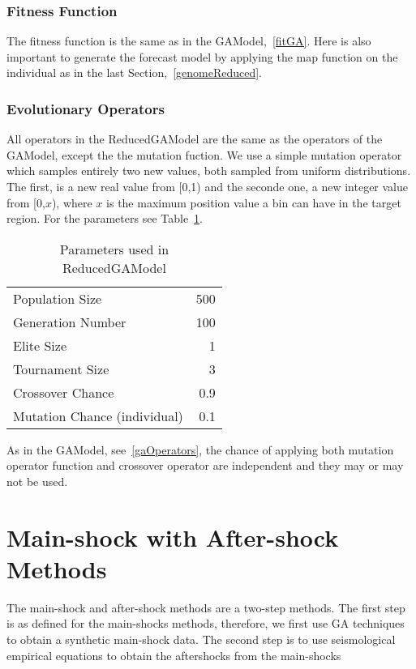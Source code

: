 \subsubsection{Fitness Function}
The fitness function is the same as in the GAModel,~\ref{fitGA}. Here is also important to generate the forecast model by applying the map function on the individual as in the last Section,~\ref{genomeReduced}.\\

\subsubsection{Evolutionary Operators}\label{ReducedOperators}
All operators in the ReducedGAModel are the same as the operators of the GAModel, except the the mutation fuction. We use a simple mutation operator which samples entirely two new values, both sampled from uniform distributions. The first, is a new real value from [0,1) and the seconde one, a new integer value from [0,$x$), where $x$ is the maximum position value a bin can have in the target region. For the parameters see Table~\ref{GAHParameters}.

\begin{table}[!ht]
  \caption{Parameters used in ReducedGAModel}
  \label{GAHParameters}
  \begin{center}
  \begin{tabular}{|l|r|}
    \hline
    Population Size & 500\\
    Generation Number & 100\\
    Elite Size & 1\\
    Tournament Size & 3\\
    Crossover Chance & 0.9\\
    Mutation Chance (individual) & 0.1\\
    \hline    
  \end{tabular}
  \end{center}
\end{table}

As in the GAModel, see~\ref{gaOperators}, the chance of applying both mutation operator function and crossover operator are independent and they may or may not be used.\\

\section{Main-shock with After-shock Methods}\label{m+a+e}
The main-shock and after-shock methods are a two-step methods. The first step is as defined for the main-shocks methods, therefore, we first use GA techniques to obtain a synthetic main-shock data. The second step is to use seismological empirical equations to obtain the aftershocks from the main-shocks\\


